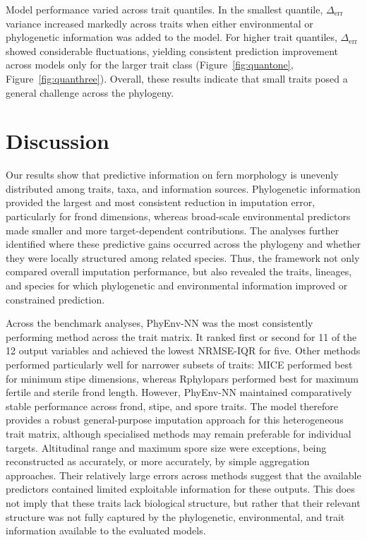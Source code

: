 \documentclass[preprint,12pt,authoryear]{elsarticle}
\newcommand{\awesomeModel}{PhyEnv-NN }
\begin{document}
Model performance varied across trait quantiles. In the smallest quantile, $\Delta_\mathrm{err}$ variance increased markedly across traits when either environmental or phylogenetic information was added to the model. For higher trait quantiles,  $\Delta_\mathrm{err}$ showed considerable fluctuations, yielding consistent prediction improvement across models only for the larger trait class (Figure~\ref{fig:quantone}, Figure~\ref{fig:quanthree}). Overall, these results indicate that small traits posed a general challenge across the phylogeny.

\section{Discussion}

Our results show that predictive information on fern morphology is unevenly distributed among traits, taxa, and information sources. Phylogenetic information provided the largest and most consistent reduction in imputation error, particularly for frond dimensions, whereas broad-scale environmental predictors made smaller and more target-dependent contributions. The analyses further identified where these predictive gains occurred across the phylogeny and whether they were locally structured among related species. Thus, the framework not only compared overall imputation performance, but also revealed the traits, lineages, and species for which phylogenetic and environmental information improved or constrained prediction.

Across the benchmark analyses, \awesomeModel{} was the most consistently performing method across the trait matrix. It ranked first or second for 11 of the 12 output variables and achieved the lowest NRMSE-IQR for five. Other methods performed particularly well for narrower subsets of traits: MICE performed best for minimum stipe dimensions, whereas Rphylopars performed best for maximum fertile and sterile frond length. However, \awesomeModel{} maintained comparatively stable performance across frond, stipe, and spore traits. The model therefore provides a robust general-purpose imputation approach for this heterogeneous trait matrix, although specialised methods may remain preferable for individual targets. Altitudinal range and maximum spore size were exceptions, being reconstructed as accurately, or more accurately, by simple aggregation approaches. Their relatively large errors across methods suggest that the available predictors contained limited exploitable information for these outputs. This does not imply that these traits lack biological structure, but rather that their relevant structure was not fully captured by the phylogenetic, environmental, and trait information available to the evaluated models.
\end{document}
